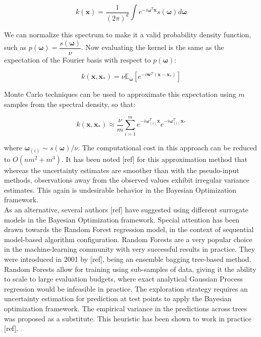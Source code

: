 \documentclass[10pt,a4paper,twoside]{book}
\begin{document}
\begin{equation}
k(\boldsymbol{x}) = \dfrac{1}{(2\pi)^d}\int e^{-i\boldsymbol{\omega}^T\boldsymbol{x}}s(\boldsymbol{\omega}) d\boldsymbol{\omega}
\end{equation}

We can normalize this spectrum to make it a valid probability density function, such as $p(\boldsymbol{\omega}) = \dfrac{s(\boldsymbol{\omega})}{\nu}$. Now evaluating the kernel is the same as the expectation of the Fourier basis with respect to $p(\boldsymbol{\omega})$:

\begin{equation}
k(\boldsymbol{x}, \boldsymbol{x_*}) = \nu \mathbb{E}_{\boldsymbol{\omega}}\left[ e^{-i\boldsymbol{w}^T(\boldsymbol{x} - \boldsymbol{x}_*)}   \right]
\end{equation}

Monte Carlo techniques can be used to approximate this expectation using $m$ samples from the spectral density, so that:

\begin{equation}
k(\boldsymbol{x}, \boldsymbol{x_*}) \approx \dfrac{\nu}{m}\sum_{i=1}^m e^{-i\boldsymbol{\omega}_{(i)}^T\boldsymbol{x}} e^{-i\boldsymbol{\omega}_{(i)}^T\boldsymbol{x_*}} 
\end{equation}

where $\boldsymbol{\omega}_{(i)} \sim s(\boldsymbol{\omega})/\nu$. The computational cost in this approach can be reduced to $O(nm^2 + m^3)$. It has been noted [ref] for this approximation method that whereas the uncertainty estimates are smoother than with the pseudo-input methods, observations away from the observed values exhibit irregular variance estimates. This again is undesirable behavior in the Bayesian Optimization framework.\\

As an alternative, several authors [ref] have suggested using different surrogate models in the Bayesian Optimization framework. Special attention has been drawn towards the Random Forest regression model, in the context of sequential model-based algorithm configuration. Random Forests are a very popular choice in the machine-learning community with very successful results in practice. They were introduced in 2001 by [ref], being an ensemble bagging tree-based method. Random Forests allow for training using sub-samples of data, giving it the ability to scale to large evaluation budgets, where exact analytical Gaussian Process regression would be infeasible in practice. The exploration strategy requires an uncertainty estimation for prediction at test points to apply the Bayesian optimization framework. The empirical variance in the predictions across trees was proposed as a substitute. This heuristic has been shown to work in practice [ref].\\
\end{document}
